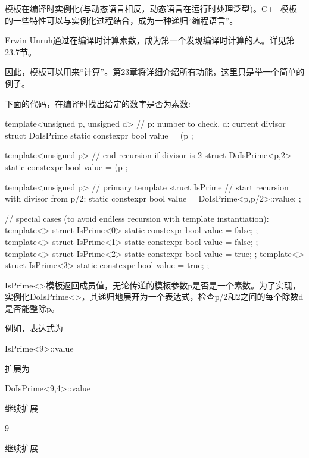 模板在编译时实例化(与动态语言相反，动态语言在运行时处理泛型)。C++模板的一些特性可以与实例化过程结合，成为一种递归“编程语言”。

\begin{notice}Erwin Unruh通过在编译时计算素数，成为第一个发现编译时计算的人。详见第23.7节。
\end{notice}

因此，模板可以用来“计算”。第23章将详细介绍所有功能，这里只是举一个简单的例子。

下面的代码，在编译时找出给定的数字是否为素数:

\begin{cpp}
template<unsigned p, unsigned d> // p: number to check, d: current divisor
struct DoIsPrime {
	static constexpr bool value = (p%
};

template<unsigned p> // end recursion if divisor is 2
struct DoIsPrime<p,2> {
	static constexpr bool value = (p%
};

template<unsigned p> // primary template
struct IsPrime {
	// start recursion with divisor from p/2:
	static constexpr bool value = DoIsPrime<p,p/2>::value;
};

// special cases (to avoid endless recursion with template instantiation):
template<>
struct IsPrime<0> { static constexpr bool value = false; };
template<>
struct IsPrime<1> { static constexpr bool value = false; };
template<>
struct IsPrime<2> { static constexpr bool value = true; };
template<>
struct IsPrime<3> { static constexpr bool value = true; };
\end{cpp}

IsPrime<>模板返回成员值，无论传递的模板参数p是否是一个素数。为了实现，实例化DoIsPrime<>，其递归地展开为一个表达式，检查p/2和2之间的每个除数d是否能整除p。

例如，表达式为

\begin{cpp}
IsPrime<9>::value
\end{cpp}

扩展为

\begin{cpp}
DoIsPrime<9,4>::value
\end{cpp}

继续扩展

\begin{cpp}
9%
\end{cpp}

继续扩展

